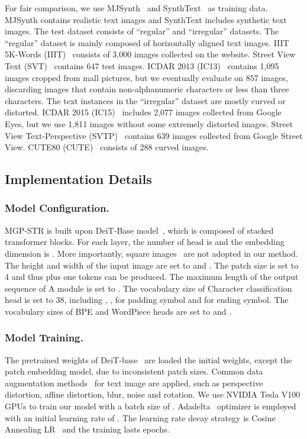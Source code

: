 \documentclass[runningheads]{llncs}
\begin{document}
For fair comparison, we use MJSynth~\cite{MJ1,MJ2} and SynthText~\cite{ST} as training data. MJSynth contains  realistic text images and SynthText includes  synthetic text images. The test dataset consists of ``regular'' and ``irregular'' datasets. The ``regular'' dataset is mainly composed of horizontally aligned text images. IIIT 5K-Words (IIIT)~\cite{IIIT} consists of 3,000 images collected on the website. Street View Text (SVT)~\cite{SVT} contains 647 test images. ICDAR 2013 (IC13)~\cite{IC13} contains 1,095 images cropped from mall pictures, but we eventually evaluate on 857 images, discarding images that contain non-alphanumeric characters or less than three characters. The text instances in the ``irregular'' dataset are mostly curved or distorted. ICDAR 2015 (IC15)~\cite{IC15} includes 2,077 images collected from Google Eyes, but we use 1,811 images without some extremely distorted images. Street View Text-Perspective (SVTP)~\cite{SVTP} contains 639 images collected from Google Street View. CUTE80 (CUTE)~\cite{CUTE} consists of 288 curved images.







\subsection{Implementation Details}

\subsubsection{Model Configuration.} 
MGP-STR is built upon DeiT-Base model~\cite{deit}, which is composed of  stacked transformer blocks.
For each layer, the number of head is  and the embedding dimension  is . 
More importantly, square  images~\cite{dosovitskiy2020image,deit,ViTSTR} are not adopted in our method.
The height  and width  of the input image are set to  and .
The patch size  is set to 4 and thus  plus one  tokens  can be produced.
The maximum length  of the output sequence  of A module is set to . 
The vocabulary size  of Character classification head is set to 38, including , ,  for padding symbol and  for ending symbol.
The vocabulary sizes of BPE and WordPiece heads are set to  and .



\subsubsection{Model Training.} 
The pretrained weights of DeiT-base~\cite{deit} are loaded the initial weights, except the patch embedding model, due to inconsistent patch sizes.
Common data augmentation methods~\cite{randaug} for text image are applied, such as perspective distortion, affine distortion, blur, noise and rotation.
We use  NVIDIA Tesla V100 GPUs to train our model with a batch size of . Adadelta~\cite{Adadelta} optimizer is employed with an initial learning rate of .
The learning rate decay strategy is Cosine Annealing LR~\cite{cosinlr} and the training lasts  epochs.
\end{document}
